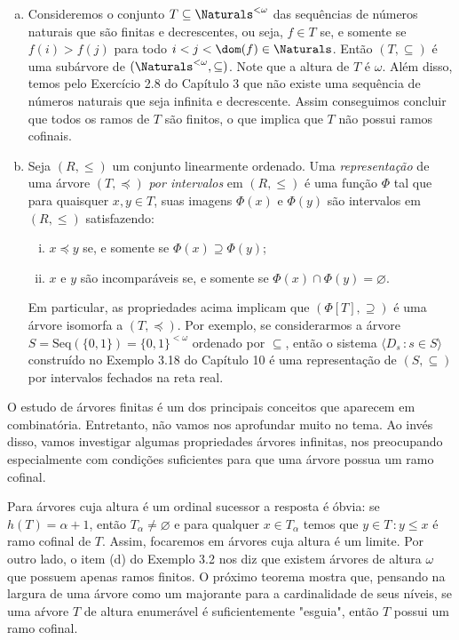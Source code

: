 \documentclass[a4paper]{article}
\theoremstyle{plain}\newtheorem{teo}{Teorema}[section]
\begin{document}
\begin{exemplo}
\begin{enumerate}[(a)]
   \item Consideremos o conjunto
    \(T\subseteq \Naturals^{<\omega}\)
     das sequências de números naturais que são finitas e
    decrescentes, ou seja, \(f\in T \) se, e somente se  \(f(i)>f(j)\)  para todo
    \(i<j<\dom(f)\in\Naturals\).  Então \((T,\subseteq)\) é uma subárvore de
    \((\Naturals^{<\omega},\subseteq)\). Note que a altura de  \(T\) é 
    \(\omega\). Além disso, temos pelo Exercício 2.8 do Capítulo 3 que não
    existe uma sequência de números naturais que seja infinita e decrescente.
    Assim conseguimos concluir que todos os ramos de \(T\) são finitos, o
    que implica que \(T\) não possui ramos cofinais.

  \item Seja \((R,\leq)\) um conjunto linearmente ordenado.
    Uma \emph{representação} de uma árvore \((T,\preceq)\)
    \emph{por intervalos} em \((R,\leq)\) é uma função \(\Phi\) tal que para
    quaisquer \(x,y\in T\),
    suas imagens \(\Phi(x)\) e \(\Phi(y)\) são intervalos em \((R,\leq)\) satisfazendo:
    \begin{enumerate}[(i)]
    \item \(x\preceq y\) se, e somente se \(\Phi(x)\supseteq\Phi(y)\); 
    \item \(x\) e \(y\) são incomparáveis se, e somente se \(\Phi(x)\cap\Phi(y) =\varnothing\).
    \end{enumerate}
    Em particular, as propriedades acima implicam que \((\Phi[T],\supseteq)\) é
    uma árvore isomorfa a \((T,\preceq)\). Por exemplo, se considerarmos
    a árvore \(S=\text{Seq}(\{0,1\})=\{0,1\}^{<\omega}\) ordenado por \(\subseteq\),
    então o sistema \(\langle D_s \,\colon s\in S\rangle\) construído no Exemplo
    3.18 do  Capítulo 10 é uma representação de \((S,\subseteq)\) por intervalos
    fechados na reta real.
    \end{enumerate}
  \end{exemplo}
  
  O estudo de árvores finitas é um dos  principais conceitos que aparecem em
  combinatória. Entretanto, não vamos nos aprofundar muito no tema. Ao invés
  disso, vamos investigar algumas propriedades árvores infinitas, nos preocupando
  especialmente com condições suficientes para que uma árvore possua um ramo cofinal.

  Para árvores cuja altura é um ordinal sucessor a resposta é óbvia: se \(h(T)=\alpha +1\),
  então \(T_\alpha\neq\varnothing\) e para qualquer \(x\in T_\alpha\) temos que
  \({{y\in T \,\colon y\leq x}}\) é ramo cofinal de \(T\). Assim, focaremos em
  árvores cuja altura é um limite. Por outro lado, o item (d) do Exemplo 3.2 nos diz que
  existem árvores de altura \(\omega\) que possuem apenas ramos finitos. O
  próximo teorema mostra que,  pensando na largura de uma árvore como um
  majorante para a cardinalidade de seus níveis, se uma aŕvore \(T\) de altura
  enumerável é suficientemente "esguia", então \(T\) possui um ramo cofinal.
\end{document}

